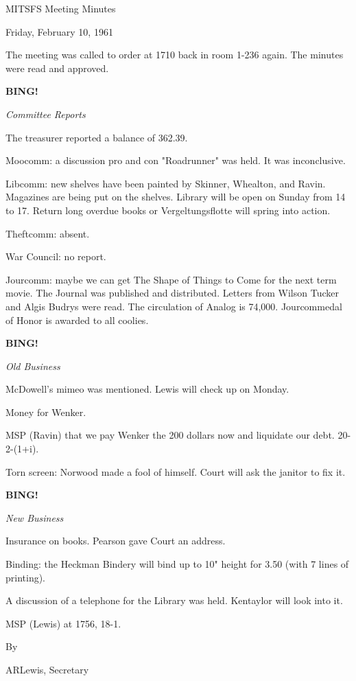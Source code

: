 \documentclass[12pt]{article}
\newcommand{\bing}{{\bf BING!} }
\newcommand{\goto}[1]{\bing \vskip 12pt \centerline{{\em{#1}}}}
\begin{document}
\begin{center}

MITSFS Meeting Minutes

Friday, February 10, 1961

\end{center}
 
\vspace{12pt}

\setlength{\parskip}{6pt}

\noindent
The meeting was called to order at 1710 back in room 1-236 again. The minutes were read and approved.

\goto{Committee Reports}

The treasurer reported a balance of 362.39.

Moocomm: a discussion pro and con "Roadrunner" was held. It was inconclusive.

Libcomm: new shelves have been painted by Skinner, Whealton, and Ravin. Magazines are being put on the shelves. Library will be open on Sunday from 14 to 17. Return long overdue books or Vergeltungsflotte will spring into action.

Theftcomm: absent.

War Council: no report.

Jourcomm: maybe we can get The Shape of Things to Come for the next term movie. The Journal was published and distributed. Letters from Wilson Tucker and Algis Budrys were read. The circulation of Analog is 74,000. Jourcommedal of Honor is awarded to all coolies.

\goto{Old Business}

McDowell's mimeo was mentioned. Lewis will check up on Monday.

Money for Wenker.

MSP (Ravin) that we pay Wenker the 200 dollars now and liquidate our debt. 20-2-(1+i).

Torn screen: Norwood made a fool of himself. Court will ask the janitor to fix it.

\goto{New Business}

Insurance on books. Pearson gave Court an address.

Binding: the Heckman Bindery will bind up to 10" height for 3.50 (with 7 lines of printing).

A discussion of a telephone for the Library was held. Kentaylor will look into it.

MSP (Lewis) at 1756, 18-1.

\vspace{12pt}

\centerline{By}
\centerline{ARLewis, Secretary}
\end{document}
